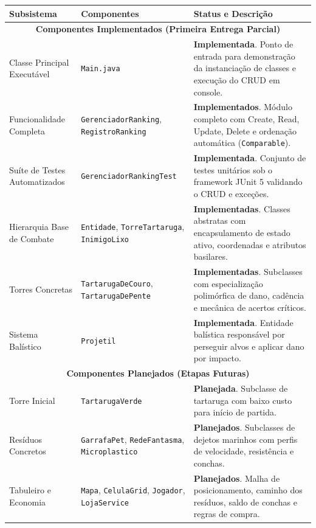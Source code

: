 \documentclass[11pt,a4paper]{article}
\begin{document}
\begin{table}[h!]
\centering
\small
\begin{tabularx}{\textwidth}{|p{}|p{}|X|}
\hline
\textbf{Subsistema} & \textbf{Componentes} & \textbf{Status e Descrição} \\
\hline
\multicolumn{3}{|c|}{\cellcolor{gray!15}\textbf{Componentes Implementados (Primeira Entrega Parcial)}} \\
\hline
Classe Principal Executável & \texttt{Main.java} & \textbf{Implementada}. Ponto de entrada para demonstração da instanciação de classes e execução do CRUD em console. \\
\hline
Funcionalidade Completa & \texttt{GerenciadorRanking}, \texttt{RegistroRanking} & \textbf{Implementados}. Módulo completo com Create, Read, Update, Delete e ordenação automática (\texttt{Comparable}). \\
\hline
Suíte de Testes Automatizados & \texttt{GerenciadorRankingTest} & \textbf{Implementada}. Conjunto de testes unitários sob o framework JUnit 5 validando o CRUD e exceções. \\
\hline
Hierarquia Base de Combate & \texttt{Entidade}, \texttt{TorreTartaruga}, \texttt{InimigoLixo} & \textbf{Implementadas}. Classes abstratas com encapsulamento de estado ativo, coordenadas e atributos basilares. \\
\hline
Torres Concretas & \texttt{TartarugaDeCouro}, \texttt{TartarugaDePente} & \textbf{Implementadas}. Subclasses com especialização polimórfica de dano, cadência e mecânica de acertos críticos. \\
\hline
Sistema Balístico & \texttt{Projetil} & \textbf{Implementada}. Entidade balística responsável por perseguir alvos e aplicar dano por impacto. \\
\hline
\multicolumn{3}{|c|}{\cellcolor{gray!15}\textbf{Componentes Planejados (Etapas Futuras)}} \\
\hline
Torre Inicial & \texttt{TartarugaVerde} & \textbf{Planejada}. Subclasse de tartaruga com baixo custo para início de partida. \\
\hline
Resíduos Concretos & \texttt{GarrafaPet}, \texttt{RedeFantasma}, \texttt{Microplastico} & \textbf{Planejados}. Subclasses de dejetos marinhos com perfis de velocidade, resistência e conchas. \\
\hline
Tabuleiro e Economia & \texttt{Mapa}, \texttt{CelulaGrid}, \texttt{Jogador}, \texttt{LojaService} & \textbf{Planejados}. Malha de posicionamento, caminho dos resíduos, saldo de conchas e regras de compra. \\

\end{tabularx}
\end{table}
\end{document}
